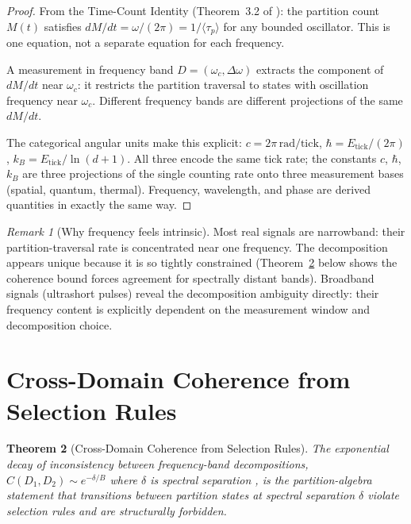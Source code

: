 \documentclass[twocolumn,10pt,a4paper]{article}
\theoremstyle{thmstyle}
\newtheorem{theorem}{Theorem}[section]
\theoremstyle{definition}
\theoremstyle{remark}
\newtheorem{remark}[theorem]{Remark}
\begin{document}
\begin{proof}
From the Time-Count Identity (Theorem~3.2 of \citealt{companion:math}):
the partition count $M(t)$ satisfies $dM/dt = \omega/(2\pi) = 1/\langle\tau_p\rangle$
for any bounded oscillator.  This is one equation, not a separate equation
for each frequency.

A measurement in frequency band $D = (\omega_c, \Delta\omega)$ extracts
the component of $dM/dt$ near $\omega_c$: it restricts the partition
traversal to states with oscillation frequency near $\omega_c$.
Different frequency bands are different projections of the same $dM/dt$.

The categorical angular units \citep{companion:math} make this explicit:
$c = 2\pi\,\text{rad/tick}$, $\hbar = E_\text{tick}/(2\pi)$,
$k_B = E_\text{tick}/\ln(d+1)$.
All three encode the same tick rate; the constants $c$, $\hbar$, $k_B$
are three projections of the single counting rate onto three measurement
bases (spatial, quantum, thermal).  Frequency, wavelength, and phase are
derived quantities in exactly the same way.
\end{proof}

\begin{remark}[Why frequency feels intrinsic]
Most real signals are narrowband: their partition-traversal rate is
concentrated near one frequency.  The decomposition appears unique because
it is so tightly constrained (Theorem~\ref{thm:coherence} below shows the
coherence bound forces agreement for spectrally distant bands).
Broadband signals (ultrashort pulses) reveal the decomposition ambiguity
directly: their frequency content is explicitly dependent on the measurement
window and decomposition choice.
\end{remark}

\section{Cross-Domain Coherence from Selection Rules}
\label{sec:coherence}

\begin{theorem}[Cross-Domain Coherence from Selection Rules]
\label{thm:coherence}
The exponential decay of inconsistency between frequency-band decompositions,
$C(D_1, D_2) \sim e^{-\delta/B}$ where $\delta$ is spectral separation
\citep{companion:signal_source}, is the partition-algebra statement that
transitions between partition states at spectral separation $\delta$
violate selection rules and are structurally forbidden.
\end{theorem}
\end{document}

